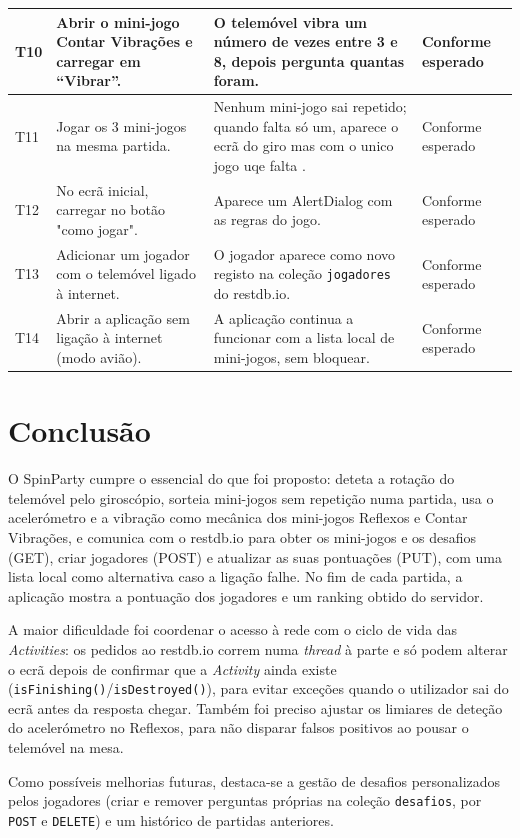 \documentclass[runningheads,a4paper]{llncs}
\begin{document}
\begin{table}[H]
\begin{tabular}{|p{0.7cm}|p{3.6cm}|p{3.4cm}|p{2.4cm}|}
\hline
T10 & Abrir o mini-jogo Contar Vibrações e carregar em ``Vibrar''. & O
telemóvel vibra um número de vezes entre 3 e 8, depois pergunta quantas
foram. & Conforme esperado \\ \hline
T11 & Jogar os 3 mini-jogos na mesma partida. & Nenhum mini-jogo sai
repetido; quando falta só um, aparece o ecrã do giro mas com o unico jogo uqe falta . &
Conforme esperado \\ \hline
T12 & No ecrã inicial, carregar no botão "como jogar". & Aparece um AlertDialog
com as regras do jogo. & Conforme esperado \\ \hline
T13 & Adicionar um jogador com o telemóvel ligado à internet. & O jogador
aparece como novo registo na coleção \texttt{jogadores} do restdb.io. &
Conforme esperado \\ \hline
T14 & Abrir a aplicação sem ligação à internet (modo avião). & A aplicação
continua a funcionar com a lista local de mini-jogos, sem bloquear. &
Conforme esperado \\ \hline
\end{tabular}
\end{table}


\section{Conclusão}
\label{sec:conclusao}
O SpinParty cumpre o essencial do que foi proposto: deteta a rotação do
telemóvel pelo giroscópio, sorteia mini-jogos sem repetição numa partida,
usa o acelerómetro e a vibração como mecânica dos mini-jogos Reflexos e
Contar Vibrações, e comunica com o restdb.io para obter os mini-jogos e os
desafios (GET), criar jogadores (POST) e atualizar as suas pontuações
(PUT), com uma lista local como alternativa caso a ligação falhe. No fim
de cada partida, a aplicação mostra a pontuação dos jogadores e um ranking
obtido do servidor.

A maior dificuldade foi coordenar o acesso à rede com o ciclo de vida das
\emph{Activities}: os pedidos ao restdb.io correm numa \emph{thread} à
parte e só podem alterar o ecrã depois de confirmar que a \emph{Activity}
ainda existe (\texttt{isFinishing()}/\texttt{isDestroyed()}), para evitar
exceções quando o utilizador sai do ecrã antes da resposta chegar. Também
foi preciso ajustar os limiares de deteção do acelerómetro no Reflexos, para
não disparar falsos positivos ao pousar o telemóvel na mesa.

Como possíveis melhorias futuras, destaca-se a gestão de desafios
personalizados pelos jogadores (criar e remover perguntas próprias na
coleção \texttt{desafios}, por \texttt{POST} e \texttt{DELETE}) e um
histórico de partidas anteriores.
\end{document}
